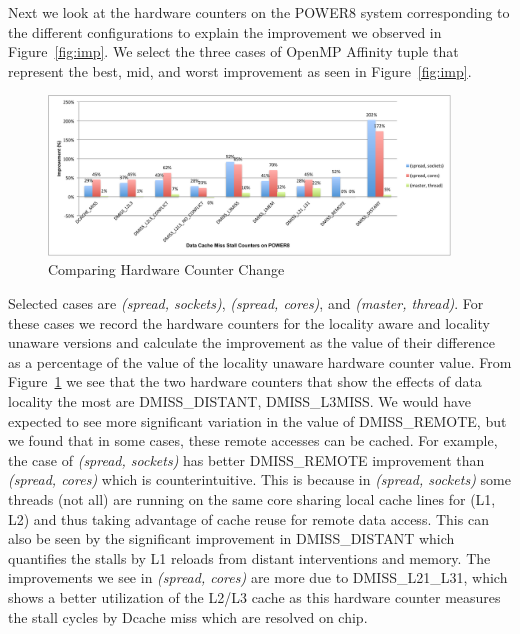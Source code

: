 %
Next we look at the hardware counters on the POWER8 system corresponding to the different configurations to explain the improvement we observed in Figure~\ref{fig:imp}.
We select the three cases of OpenMP Affinity tuple that represent the best, mid, and worst improvement as seen in Figure~\ref{fig:imp}. 
 \begin{figure}[h!]
  \centering
  \includegraphics[height=0.4\textwidth, width=0.95\textwidth]{./Images/HW.pdf}
       \caption{Comparing Hardware Counter Change}
       \label{fig:HW}
\end{figure}
Selected cases are \textit{(spread, sockets)},  \textit{(spread, cores)}, and \textit{(master, thread)}. 
For these cases we record the hardware counters for the locality aware and locality unaware versions and calculate the improvement as the value of their difference as a percentage of the value of the locality unaware hardware counter value. 
From Figure~\ref{fig:HW} we see that the two hardware counters that show the effects of data locality the most are DMISS\_DISTANT, DMISS\_L3MISS.
We would have expected to see more significant variation in the value of DMISS\_REMOTE, but we found that in some cases, these remote accesses can be cached.
For example, the case of \textit{(spread, sockets)} has better DMISS\_REMOTE improvement than  \textit{(spread, cores)} which is counterintuitive. 
This is because in \textit{(spread, sockets)} some threads (not all) are running on the same core sharing local cache lines for (L1, L2) and thus taking advantage of cache reuse for remote data access. 
This can also be seen by the significant improvement in DMISS\_DISTANT which quantifies the stalls by L1 reloads from distant interventions and memory. The improvements we see in \textit{(spread, cores)} are more due to DMISS\_L21\_L31, which shows a better utilization of the L2/L3 cache as this hardware counter measures the stall cycles by Dcache miss which are resolved on chip. 

